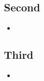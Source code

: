 \begin{slide}
\section{Second}

\begin{PauseHighLight}
  \begin{itemize}
  \item 
  \end{itemize}
\end{PauseHighLight}

\end{slide}

\Outline %

\begin{slide}
\section{Third}

\begin{PauseHighLight}
  \begin{itemize}
  \item 
  \end{itemize}
\end{PauseHighLight}

\end{slide}




